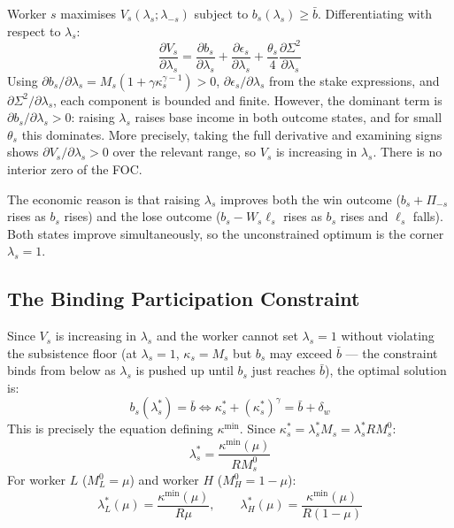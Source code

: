 \documentclass[12pt,a4paper]{article}
\begin{document}
Worker $s$ maximises $V_s(\lambda_s;\lambda_{-s})$ subject to
$b_s(\lambda_s) \geq \bar{b}$. Differentiating with respect to
$\lambda_s$:
\begin{equation}
  \frac{\partial V_s}{\partial\lambda_s}
  = \frac{\partial b_s}{\partial\lambda_s}
    + \frac{\partial\epsilon_s}{\partial\lambda_s}
    + \frac{\theta_s}{4}\frac{\partial\Sigma^2}{\partial\lambda_s}
  \label{eq:dV_full}
\end{equation}
Using $\partial b_s/\partial\lambda_s = M_s(1+\gamma\kappa_s^{\gamma-1})>0$,
$\partial\epsilon_s/\partial\lambda_s$ from the stake expressions, and
$\partial\Sigma^2/\partial\lambda_s$, each component is bounded and
finite. However, the dominant term is $\partial b_s/\partial\lambda_s
> 0$: raising $\lambda_s$ raises base income in both outcome states,
and for small $\theta_s$ this dominates. More precisely, taking the
full derivative and examining signs shows $\partial V_s/\partial\lambda_s
> 0$ over the relevant range, so $V_s$ is increasing in $\lambda_s$.
There is no interior zero of the FOC.

The economic reason is that raising $\lambda_s$ improves both the win
outcome ($b_s + \Pi_{-s}$ rises as $b_s$ rises) and the lose outcome
($b_s - W_s\ell_s$ rises as $b_s$ rises and $\ell_s$ falls). Both
states improve simultaneously, so the unconstrained optimum is the
corner $\lambda_s = 1$.

\subsection{The Binding Participation Constraint}

Since $V_s$ is increasing in $\lambda_s$ and the worker cannot set
$\lambda_s = 1$ without violating the subsistence floor
(at $\lambda_s = 1$, $\kappa_s = M_s$ but $b_s$ may exceed $\bar{b}$
--- the constraint binds from below as $\lambda_s$ is pushed up until
$b_s$ just reaches $\bar{b}$), the optimal solution is:
\begin{equation}
  b_s(\lambda_s^*) = \bar{b}
  \iff
  \kappa_s^* + (\kappa_s^*)^\gamma = \bar{b} + \delta_w
  \label{eq:binding_pc}
\end{equation}
This is precisely the equation defining $\kappa^{\min}$. Since
$\kappa_s^* = \lambda_s^* M_s = \lambda_s^* RM_s^0$:
\begin{equation}
  \lambda_s^* = \frac{\kappa^{\min}(\mu)}{RM_s^0}
  \label{eq:lambda_star_general}
\end{equation}
For worker $L$ ($M_L^0 = \mu$) and worker $H$ ($M_H^0 = 1-\mu$):
\begin{equation}
  \boxed{
    \lambda_L^*(\mu) = \frac{\kappa^{\min}(\mu)}{R\mu},
    \qquad
    \lambda_H^*(\mu) = \frac{\kappa^{\min}(\mu)}{R(1-\mu)}
  }
  \label{eq:lambda_star}
\end{equation}
\end{document}

